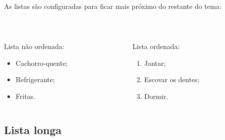 \documentclass[aspectratio=169]{beamer}
\begin{document}
\begin{frame}[t]\frametitle{\secname}\framesubtitle{\subsecname}
  As listas são configuradas para ficar mais próximo do restante do tema:

  ~
  \begin{columns}[T]
    \begin{column}{.5\textwidth}
      Lista não ordenada:
      \begin{itemize}
        \item Cachorro-quente;
        \item Refrigerante;
        \item Fritas.
      \end{itemize}
    \end{column}
    \begin{column}{.5\textwidth}
      Lista ordenada:
      \begin{enumerate}
        \item Jantar;
        \item Escovar os dentes;
        \item Dormir.
      \end{enumerate}
    \end{column}
  \end{columns}
\end{frame}

\subsection{Lista longa}
\end{document}
